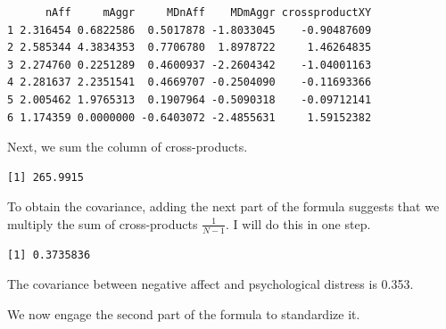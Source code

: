 \documentclass[
  11pt,
]{book}
\newenvironment{Shaded}{\begin{snugshade}}{\end{snugshade}}
\newcommand{\CommentTok}[1]{\textcolor[rgb]{0.56,0.35,0.01}{\textit{#1}}}
\newcommand{\DecValTok}[1]{\textcolor[rgb]{0.00,0.00,0.81}{#1}}
\newcommand{\FunctionTok}[1]{\textcolor[rgb]{0.00,0.00,0.00}{#1}}
\newcommand{\NormalTok}[1]{#1}
\newcommand{\OtherTok}[1]{\textcolor[rgb]{0.56,0.35,0.01}{#1}}
\newcommand{\SpecialCharTok}[1]{\textcolor[rgb]{0.00,0.00,0.00}{#1}}
\begin{document}
\begin{verbatim}
      nAff     mAggr     MDnAff    MDmAggr crossproductXY
1 2.316454 0.6822586  0.5017878 -1.8033045    -0.90487609
2 2.585344 4.3834353  0.7706780  1.8978722     1.46264835
3 2.274760 0.2251289  0.4600937 -2.2604342    -1.04001163
4 2.281637 2.2351541  0.4669707 -0.2504090    -0.11693366
5 2.005462 1.9765313  0.1907964 -0.5090318    -0.09712141
6 1.174359 0.0000000 -0.6403072 -2.4855631     1.59152382
\end{verbatim}

Next, we sum the column of cross-products.

\begin{Shaded}
\end{Shaded}

\begin{verbatim}
[1] 265.9915
\end{verbatim}

To obtain the covariance, adding the next part of the formula suggests that we multiply the sum of cross-products \(\frac{1}{N-1}\). I will do this in one step.

\begin{Shaded}
\end{Shaded}

\begin{verbatim}
[1] 0.3735836
\end{verbatim}

The covariance between negative affect and psychological distress is 0.353.

We now engage the second part of the formula to standardize it.
\end{document}
